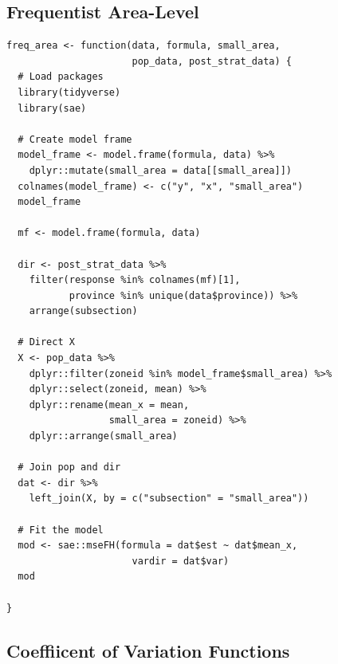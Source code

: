 \documentclass[12pt,twoside]{reedthesis}
\begin{document}
\hypertarget{frequentist-area-level}{%
\subsection{Frequentist Area-Level}\label{frequentist-area-level}}
\begin{verbatim}
freq_area <- function(data, formula, small_area,
                      pop_data, post_strat_data) {
  # Load packages
  library(tidyverse)
  library(sae)
  
  # Create model frame
  model_frame <- model.frame(formula, data) %>%
    dplyr::mutate(small_area = data[[small_area]])
  colnames(model_frame) <- c("y", "x", "small_area")
  model_frame
  
  mf <- model.frame(formula, data)
  
  dir <- post_strat_data %>% 
    filter(response %in% colnames(mf)[1],
           province %in% unique(data$province)) %>%
    arrange(subsection)
  
  # Direct X
  X <- pop_data %>%
    dplyr::filter(zoneid %in% model_frame$small_area) %>%
    dplyr::select(zoneid, mean) %>%
    dplyr::rename(mean_x = mean,
                  small_area = zoneid) %>%
    dplyr::arrange(small_area)
  
  # Join pop and dir
  dat <- dir %>%
    left_join(X, by = c("subsection" = "small_area"))

  # Fit the model
  mod <- sae::mseFH(formula = dat$est ~ dat$mean_x,
                      vardir = dat$var)
  mod
  
}
\end{verbatim}
\hypertarget{coeffiicent-of-variation-functions}{%
\subsection{Coeffiicent of Variation Functions}\label{coeffiicent-of-variation-functions}}
\end{document}
